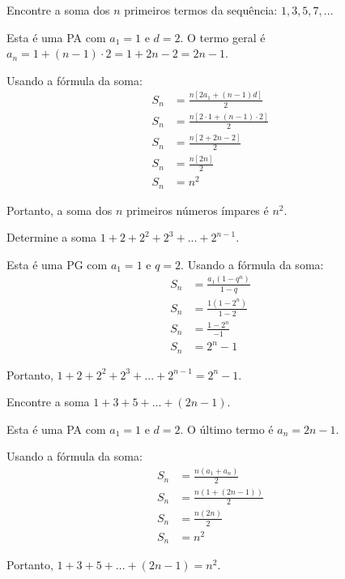 \documentclass[12pt,a4paper]{article}
\begin{document}
\begin{tcolorbox}[colback=blue!5!white,colframe=blue!75!black,title=Exercício I1]
Encontre a soma dos $n$ primeiros termos da sequência: $1, 3, 5, 7, ...$
\end{tcolorbox}

\begin{tcolorbox}[colback=green!5!white,colframe=green!75!black,title=Resolução]
Esta é uma PA com $a_1 = 1$ e $d = 2$. O termo geral é $a_n = 1 + (n-1) \cdot 2 = 1 + 2n - 2 = 2n - 1$.

Usando a fórmula da soma:
\begin{align}
S_n &= \frac{n[2a_1 + (n-1)d]}{2}\\
S_n &= \frac{n[2 \cdot 1 + (n-1) \cdot 2]}{2}\\
S_n &= \frac{n[2 + 2n - 2]}{2}\\
S_n &= \frac{n[2n]}{2}\\
S_n &= n^2
\end{align}

Portanto, a soma dos $n$ primeiros números ímpares é $n^2$.
\end{tcolorbox}

\begin{tcolorbox}[colback=blue!5!white,colframe=blue!75!black,title=Exercício I2]
Determine a soma $1 + 2 + 2^2 + 2^3 + ... + 2^{n-1}$.
\end{tcolorbox}

\begin{tcolorbox}[colback=green!5!white,colframe=green!75!black,title=Resolução]
Esta é uma PG com $a_1 = 1$ e $q = 2$. Usando a fórmula da soma:
\begin{align}
S_n &= \frac{a_1(1-q^n)}{1-q}\\
S_n &= \frac{1(1-2^n)}{1-2}\\
S_n &= \frac{1-2^n}{-1}\\
S_n &= 2^n - 1
\end{align}

Portanto, $1 + 2 + 2^2 + 2^3 + ... + 2^{n-1} = 2^n - 1$.
\end{tcolorbox}

\begin{tcolorbox}[colback=blue!5!white,colframe=blue!75!black,title=Exercício I3]
Encontre a soma $1 + 3 + 5 + ... + (2n-1)$.
\end{tcolorbox}

\begin{tcolorbox}[colback=green!5!white,colframe=green!75!black,title=Resolução]
Esta é uma PA com $a_1 = 1$ e $d = 2$. O último termo é $a_n = 2n-1$.

Usando a fórmula da soma:
\begin{align}
S_n &= \frac{n(a_1 + a_n)}{2}\\
S_n &= \frac{n(1 + (2n-1))}{2}\\
S_n &= \frac{n(2n)}{2}\\
S_n &= n^2
\end{align}

Portanto, $1 + 3 + 5 + ... + (2n-1) = n^2$.
\end{tcolorbox}
\end{document}
